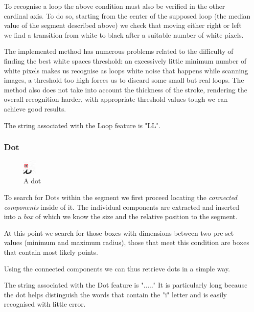 To recognise a loop the above condition must also be verified in the other cardinal axis. To do so, starting from the center of the supposed loop (the median value of the segment described above) we check that moving either right or left we find a transition from white to black after a suitable number of white pixels.

The implemented method has numerous problems related to the difficulty of finding the best white spaces threshold: an excessively little minimum number of white pixels makes us recognise as loops white noise that happens while scanning images, a threshold too high forces us to discard some small but real loops. The method also does not take into account the thickness of the stroke, rendering the overall recognition harder, with appropriate threshold values tough we can achieve good results.

The string associated with the Loop feature is "LL".
\subsubsection{Dot}

\begin{figure}
  \vspace{-20pt}
  \begin{center}
    \includegraphics[width=0.06\textwidth]{images/dot}
  \end{center}
  \vspace{-20pt}
  \caption{A dot}
  \vspace{-10pt}
\end{figure}

To search for Dots within the segment we first proceed locating the \emph{connected components} inside of it. The individual components are extracted and inserted into a \emph{box} of which we know the size and the relative position to the segment.


At this point we search for those boxes with dimensions between two pre-set values (minimum and maximum radius), those that meet this condition are boxes that contain most likely points.

Using the connected components we can thus retrieve dots in a simple way.

The string associated with the Dot feature is "....."
It is particularly long because the dot helps distinguish the words that contain the "i" letter and is easily recognised with little error.


